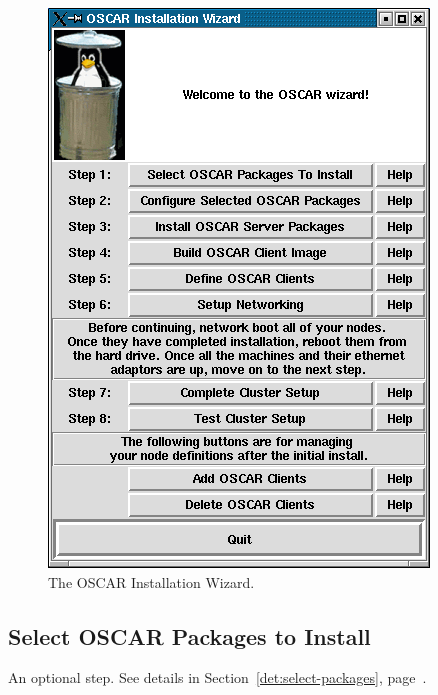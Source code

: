 \begin{figure}[ht!]
  \begin{center}
    \centerline{\includegraphics[scale=\imgscale]{figs/2_sbs-oscar-wizard}}
    \caption{The OSCAR Installation Wizard.}
    \label{fig:sbs-install-wizard}
  \end{center}
\end{figure}



\subsection{Select OSCAR Packages to Install}

An optional step.  See details in Section~\ref{det:select-packages},
page~\pageref{det:select-packages}.

